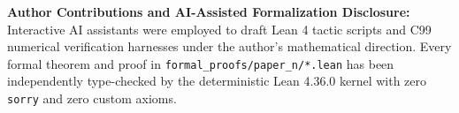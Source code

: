 \documentclass[11pt,a4paper]{article}
\begin{document}
\textbf{Author Contributions and AI-Assisted Formalization Disclosure:} Interactive AI assistants were employed to draft Lean 4 tactic scripts and C99 numerical verification harnesses under the author's mathematical direction. Every formal theorem and proof in \texttt{formal\_proofs/paper\_n/*.lean} has been independently type-checked by the deterministic Lean 4.36.0 kernel with zero \texttt{sorry} and zero custom axioms.
\end{document}
